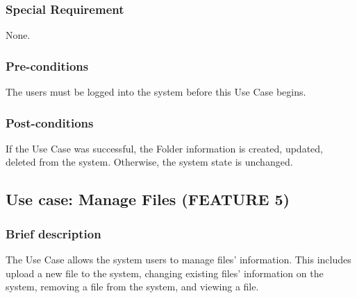 \subsubsection{Special Requirement}
None.
\subsubsection{Pre-conditions}
The users must be logged into the system before this Use Case begins.
\subsubsection{Post-conditions}
If the Use Case was successful, the Folder information is created, updated, deleted from the system. Otherwise, the system state is unchanged.

\subsection{Use case: Manage Files (FEATURE 5)}
\subsubsection{Brief description}
The Use Case allows the system users to manage files' information. This includes upload a new file to the system, changing existing files' information on the system, removing a file from the system, and viewing a file.
